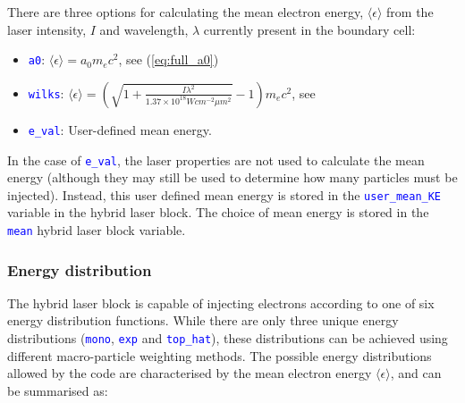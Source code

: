 \documentclass[12pt]{article}
\numberwithin{equation}{section}
\begin{document}
There are three options for calculating the mean electron energy, $\langle\epsilon\rangle$ from the laser intensity, $I$ and wavelength, $\lambda$ currently present in the boundary cell:
%
\begin{itemize}
  \item \textcolor{blue}{\texttt{a0}}: $\langle\epsilon\rangle = a_0 m_e c^2$, see (\ref{eq:full_a0}) 
  \item \textcolor{blue}{\texttt{wilks}}: $\langle\epsilon\rangle = 
      \left(
         \sqrt{1 + \frac{I\lambda^2}{1.37\times10^{18} Wcm^{-2}\mu m^2 }}
         - 1 
      \right) m_e c^2$, see \cite{theory:Wilks}
  \item \textcolor{blue}{\texttt{e\_val}}: User-defined mean energy. 
\end{itemize}
%
In the case of \textcolor{blue}{\texttt{e\_val}}, the laser properties are not used to calculate the mean energy (although they may still be used to determine how many particles must be injected). Instead, this user defined mean energy is stored in the \textcolor{blue}{\texttt{user\_mean\_KE}} variable in the hybrid laser block. The choice of mean energy is stored in the \textcolor{blue}{\texttt{mean}} hybrid laser block variable.

\subsubsection{Energy distribution} \label{sec:code:injector:energy}

The hybrid laser block is capable of injecting electrons according to one of six energy distribution functions. While there are only three unique energy distributions (\textcolor{blue}{\texttt{mono}}, \textcolor{blue}{\texttt{exp}} and \textcolor{blue}{\texttt{top\_hat}}), these distributions can be achieved using different macro-particle weighting methods. The possible energy distributions allowed by the code are characterised by the mean electron energy $\langle\epsilon\rangle$, and can be summarised as:
\end{document}
